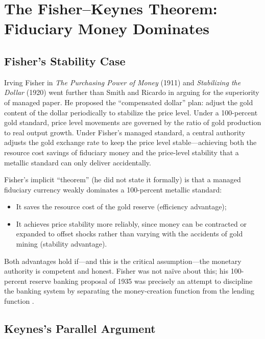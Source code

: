 \documentclass[12pt]{article}
\begin{document}
\section{The Fisher--Keynes Theorem: Fiduciary Money Dominates}
\label{sec:fisher-keynes}

\subsection{Fisher's Stability Case}

Irving Fisher in \textit{The Purchasing Power of Money} (1911)
and \textit{Stabilizing the Dollar} (1920) went further than
Smith and Ricardo in arguing for the superiority of managed paper.
He proposed the ``compensated dollar'' plan: adjust the gold
content of the dollar periodically to stabilize the price level.
Under a 100-percent gold standard, price level movements are
governed by the ratio of gold production to real output growth.
Under Fisher's managed standard, a central authority adjusts the
gold exchange rate to keep the price level stable---achieving
both the resource cost savings of fiduciary money and the
price-level stability that a metallic standard can only deliver
accidentally.

Fisher's implicit ``theorem'' (he did not state it formally)
is that a managed fiduciary currency weakly dominates a 100-percent
metallic standard:
\begin{itemize}
  \item It saves the resource cost of the gold reserve
        (efficiency advantage);
  \item It achieves price stability more reliably, since money
        can be contracted or expanded to offset shocks rather
        than varying with the accidents of gold mining
        (stability advantage).
\end{itemize}

Both advantages hold if---and this is the critical assumption---the
monetary authority is competent and honest.  Fisher was not
na\"ive about this; his 100-percent reserve banking proposal
of 1935 was precisely an attempt to discipline the banking system
by separating the money-creation function from the
lending function \citep{Fisher1935}.

\subsection{Keynes's Parallel Argument}
\end{document}
